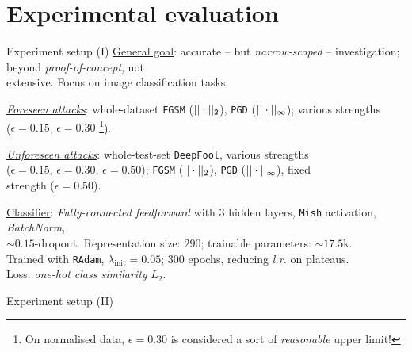 
\section{ Experimental evaluation}{

    \setcounter{footnote}{0}

    \begin{frame}{ Experiment setup (I)}
    \underline{General goal}: \alert{accurate} -- but \textit{\alert{narrow}-scoped} -- investigation; beyond \textit{proof-of-concept}, not\\extensive. Focus on \alert{image classification} tasks.

    \underline{\textit{Foreseen attacks}}: whole-\alert{dataset} \texttt{FGSM} ($||\cdot||_2$), \texttt{PGD} ($||\cdot||_{\infty}$); various strengths\\ ($\epsilon=0.15$, $\epsilon=0.30$ \footnote{On normalised data, $\epsilon=0.30$ is considered a sort of \textit{reasonable} upper limit!}).

    \underline{\textit{Unforeseen attacks}}: whole-\alert{test}-set \texttt{DeepFool}, various strengths\\ ($\epsilon=0.15$, $\epsilon=0.30$, $\epsilon=0.50$); \texttt{FGSM} ($||\cdot||_2$), \texttt{PGD} ($||\cdot||_{\infty}$), fixed\\ strength ($\epsilon=0.50$).

    \underline{Classifier}: \textit{\alert{Fully-connected feedforward}} with $3$ hidden layers, \texttt{Mish} activation, \textit{BatchNorm},\\ $\sim0.15$-dropout. Representation size: \alert{$290$}; trainable parameters: $\sim17.5$k.\\ Trained with \texttt{RAdam}, $\lambda_{\text{init}}=0.05$; $300$ epochs, reducing \textit{l.r.} on plateaus.\\ Loss: \textit{one-hot class similarity} $L_2$.
    \end{frame}

    \setcounter{footnote}{0}

    \begin{frame}{ Experiment setup (II)}


\end{frame}}
